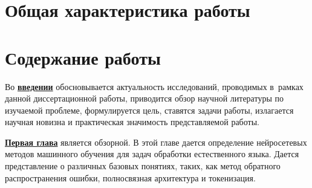 \section*{Общая характеристика работы}

\newcommand{\actuality}{\underline{\textbf{\actualityTXT}}}
\newcommand{\progress}{\underline{\textbf{\progressTXT}}}
\newcommand{\aim}{\underline{{\textbf\aimTXT}}}
\newcommand{\tasks}{\underline{\textbf{\tasksTXT}}}
\newcommand{\novelty}{\underline{\textbf{\noveltyTXT}}}
\newcommand{\appropriation}{\underline{\textbf{\appropriationTXT}}}
\newcommand{\influence}{\underline{\textbf{\influenceTXT}}}
\newcommand{\methods}{\underline{\textbf{\methodsTXT}}}
\newcommand{\defpositions}{\underline{\textbf{\defpositionsTXT}}}
\newcommand{\reliability}{\underline{\textbf{\reliabilityTXT}}}
\newcommand{\probation}{\underline{\textbf{\probationTXT}}}
\newcommand{\contribution}{\underline{\textbf{\contributionTXT}}}
\newcommand{\publications}{\underline{\textbf{\publicationsTXT}}}



\section*{Содержание работы}
Во \underline{\textbf{введении}} обосновывается актуальность
исследований, проводимых в~рамках данной диссертационной работы,
приводится обзор научной литературы по изучаемой проблеме,
формулируется цель, ставятся задачи работы, излагается научная новизна
и практическая значимость представляемой работы. 

\underline{\textbf{Первая глава}} является обзорной. В этой главе дается определение нейросетевых методов машинного обучения для задач обработки естественного языка. 
Дается представление о различных базовых понятиях, таких, как метод обратного распространения ошибки, полносвязная архитектура и токенизация. 

